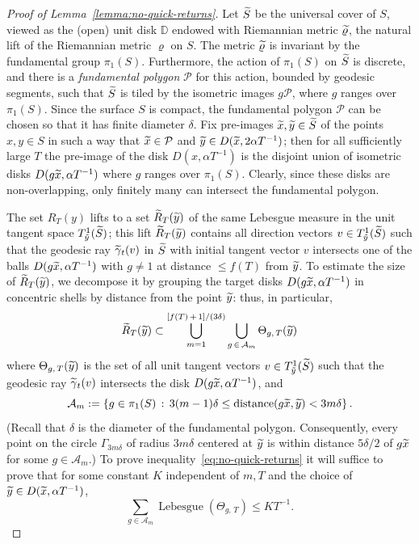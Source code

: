 \documentclass[AHL, Unicode, longabstracts, published]{cedram}
\newcommand{\xset}[1]{\left\{ #1 \right\}}
\DeclareMathOperator{\Lebesgue}{Lebesgue}
\DeclareMathOperator{\distance}{distance}
\let\oldtilde\tilde
\renewcommand*{\tilde}[1]{\mathchoice{\widetilde{#1}}{\widetilde{#1}}{\oldtilde{#1}}{\oldtilde{#1}}}\let\oldforall\forall
\renewcommand*{\forall}{\mathrel{\oldforall}}
\begin{document}
\begin{proof}[Proof of Lemma~\ref{lemma:no-quick-returns}]
Let $\tilde{S}$ be the universal cover of $S$, viewed as the (open) unit disk $\mathbb{D}$ endowed with Riemannian metric $\tilde{\varrho}$, the natural lift of the Riemannian metric $\varrho$ on $S$. The metric $\tilde{\varrho}$ is invariant by the fundamental group $\pi_{1}(S)$. Furthermore, the action of $\pi_{1}(S)$ on $\tilde{S}$ is discrete, and there is a \emph{fundamental polygon} $\mathcal{P}$ for this action, bounded by geodesic segments, such that $\tilde{S}$ is tiled by the isometric images $g\mathcal{P}$, where $g$ ranges over $\pi_{1}(S)$. Since the surface $S$ is compact, the fundamental polygon $\mathcal{P}$ can be chosen so that it has finite diameter $\delta$. Fix pre-images $\tilde{x}, \tilde{y}\in \tilde{S}$ of the points $x,y\in S$ in such a way that $\tilde{x}\in \mathcal{P}$ and $\tilde{y}\in D(\tilde{x}, 2 \alpha T^{-1})$; then for all sufficiently large $T$ the pre-image of the disk $D(x, \alpha T^{-1})$ is the disjoint union of isometric disks $D(g \tilde{x}, \alpha T^{-1})$ where $g$ ranges over $\pi_{1}(S)$. Clearly, since these disks are non-overlapping, only finitely many can intersect the fundamental polygon.

The set $R_{T}(y)$ lifts to a set $\tilde{R}_{T}(\tilde{y})$ of the same Lebesgue measure in the unit tangent space $T^{1}_{\tilde{y}}(\tilde{S})$; this lift $\tilde{R}_{T}(\tilde{y})$ contains all direction vectors $v\in T^{1}_{\tilde{y}}(\tilde{S})$ such that the geodesic ray $\tilde{\gamma}_{t}(v)$ in $\tilde{S}$ with initial tangent vector $v$ intersects one of the balls $D(g \tilde{x}, \alpha T^{-1})$ with $g \not = 1$ at distance $\leq f(T)$ from $\tilde{y}$. To estimate the size of $\tilde{R}_{T}(\tilde{y})$, we decompose it by grouping the target disks $D(g\tilde{x}, \alpha T^{-1})$ in concentric shells by distance from the point $\tilde{y}$: thus, in particular,
\[
\tilde{R}_{T}(\tilde{y})\subset
\bigcup_{m=1}^{[f(T)\,+\,1]/(3\delta)}\bigcup_{g\,\in\, \mathcal{A}_{m}}
\Theta_{g,\,T} (\tilde{y})
\]
where $\Theta_{g,\,T}(\tilde{y})$ is the set of all unit tangent vectors $v \in T^{1}_{\tilde{y}}(\tilde{S})$ such that the geodesic ray $\tilde{\gamma}_{t}(v)$ intersects the disk $D(g\tilde{x},\alpha T^{-1})$, and
\[
\mathcal{A}_{m}:=\xset {g\in \pi_{1}(S) \,:\, 3(m-1)\delta \leq\distance(g \tilde{x}, \tilde{y}) < 3m\delta}.
\]
(Recall that $\delta$ is the diameter of the fundamental polygon. Consequently, every point on the circle $\Gamma_{3m\delta}$ of radius $3 m \delta$ centered at $\tilde{y}$ is within distance $5\delta/2$ of $g\tilde{x}$ for some $g \in \mathcal{A}_{m}$.) To prove inequality~\eqref{eq:no-quick-returns} it will suffice to prove that for some constant $K$ independent of $m,T$ and the choice of $\tilde{y}\in D(\tilde{x}, \alpha T^{-1})$,
\begin{equation}\label{eq:shadow}
\sum_{g \in \mathcal{A}_{m}}\Lebesgue (\Theta_{g,\,T})\leq K T^{-1}.
\end{equation}


\end{proof}
\end{document}
